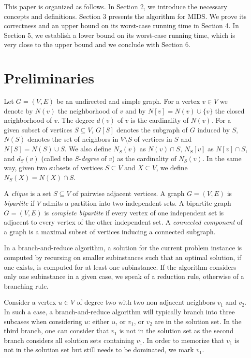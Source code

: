 \documentclass[a4paper,10pt]{article}
\theoremstyle{plain}
\theoremstyle{definition}
\theoremstyle{remark}
\newcommand{\MIDSpb}{\textsc{MIDS}\xspace}
\begin{document}
\smallskip

This paper is organized as follows. In Section 2, we introduce the necessary concepts and definitions.
Section 3 presents the algorithm for \MIDSpb. We prove
its correctness and an upper bound on its worst-case running time in Section 4.
In Section 5, we establish a lower bound on its worst-case running time, which is very close
to the upper bound
and we conclude with Section 6.


\section{Preliminaries}


Let $G=(V,E)$ be an undirected and simple graph. For a vertex $v\in V$ we denote 
by $N(v)$ the neighborhood of $v$ and by $N[v]=N(v)\cup \{v\}$ the closed neighborhood of $v$.
The degree $d(v)$ of $v$ is the cardinality of $N(v)$. For a given subset of vertices
$S\subseteq V$, $G[S]$ denotes the subgraph of $G$ induced by $S$, $N(S)$ denotes the set of
neighbors in $V\setminus S$ of vertices in $S$ and $N[S] = N(S) \cup S$. 
We also define $N_S(v)$ as $N(v) \cap S$, $N_S[v]$ as $N[v] \cap S$, and $d_S(v)$ (called the $S$-\emph{degree} of $v$) as the cardinality of
$N_S(v)$. In the same way, given two subsets of vertices $S\subseteq V$ and $X\subseteq V$, we define
$N_S(X)=N(X) \cap S$.

A \emph{clique} is a set $S \subseteq V$ of pairwise adjacent vertices.
A graph $G=(V,E)$ is \emph{bipartite} if $V$ admits a partition into two
independent sets.
A bipartite graph $G=(V,E)$ is \emph{complete bipartite} if every vertex
of one independent set is adjacent to every vertex of the other independent set.
A \emph{connected component} of a graph is a maximal subset of vertices inducing a
connected subgraph.

\medskip

In a branch-and-reduce algorithm, a solution for the current problem instance is computed by
recursing on smaller subinstances such that
an optimal solution, if one exists, is computed for at least one subinstance.
If the algorithm considers only one subinstance in a given case, we speak of a reduction rule,
otherwise of a branching rule.

Consider a vertex $u \in V$ of degree two with two non adjacent neighbors $v_1$ and $v_2$.
In such a case, a branch-and-reduce algorithm will typically branch into three subcases when considering $u$:
either $u$, or $v_1$, or $v_2$ are in the solution set. In the third branch, one can consider that
$v_1$ is not in the solution set as the second branch considers all solution sets containing $v_1$. In order
to memorize that $v_1$ is not in the solution set but still needs to be dominated, we mark $v_1$.
\end{document}

